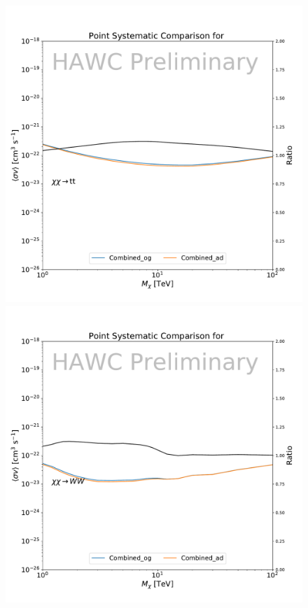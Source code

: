 \begin{figure}[h]
{        \includegraphics[scale=0.21]{figures/glory_duck/hawc/PointingSystematic_GD_Combined_tt.pdf}
        \includegraphics[scale=0.21]{figures/glory_duck/hawc/PointingSystematic_GD_Combined_ww.pdf}
}
\end{figure}
